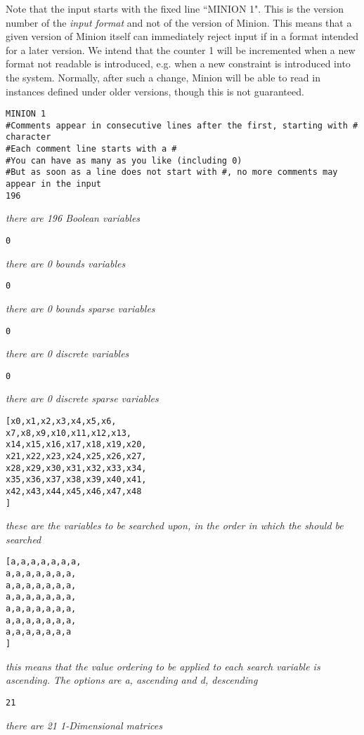 \documentclass{article}
\begin{document}
\begin{small}
Note that the input starts with the fixed line ``MINION 1".   This is the version number of the 
{\em input format} and not of the version of {\sc Minion}.   This means that a given version 
of {\sc Minion} itself can immediately reject input if in a format intended for a later version.
We intend that the counter 1 will be incremented when a new format not readable is introduced, 
e.g. when a new constraint is introduced into the system.    Normally, after such a change,
{\sc Minion} will be able to read in instances defined under older versions, though this
is not guaranteed.


\begin{verbatim}
MINION 1
#Comments appear in consecutive lines after the first, starting with # character
#Each comment line starts with a #
#You can have as many as you like (including 0)
#But as soon as a line does not start with #, no more comments may appear in the input
196
\end{verbatim}
\emph{there are 196 Boolean variables}
\begin{verbatim}
0
\end{verbatim}
\emph{there are 0 bounds variables}
\begin{verbatim}
0
\end{verbatim}
\emph{there are 0 bounds sparse variables}
\begin{verbatim}
0
\end{verbatim}
\emph{there are 0 discrete variables}
\begin{verbatim}
0
\end{verbatim}
\emph{there are 0 discrete sparse variables}
\begin{verbatim}
[x0,x1,x2,x3,x4,x5,x6,
x7,x8,x9,x10,x11,x12,x13,
x14,x15,x16,x17,x18,x19,x20,
x21,x22,x23,x24,x25,x26,x27,
x28,x29,x30,x31,x32,x33,x34,
x35,x36,x37,x38,x39,x40,x41,
x42,x43,x44,x45,x46,x47,x48
]
\end{verbatim}
\emph{these are the variables to be searched upon, in the order in which the should be searched}
\begin{verbatim}
[a,a,a,a,a,a,a,
a,a,a,a,a,a,a,
a,a,a,a,a,a,a,
a,a,a,a,a,a,a,
a,a,a,a,a,a,a,
a,a,a,a,a,a,a,
a,a,a,a,a,a,a
]
\end{verbatim}
\emph{this means that the value ordering to be applied to each search variable is ascending. The options are a, ascending and d, descending}
\begin{verbatim}
21
\end{verbatim}
\emph{there are 21 1-Dimensional matrices}
\begin{verbatim}

\end{verbatim}
\end{small}
\end{document}
